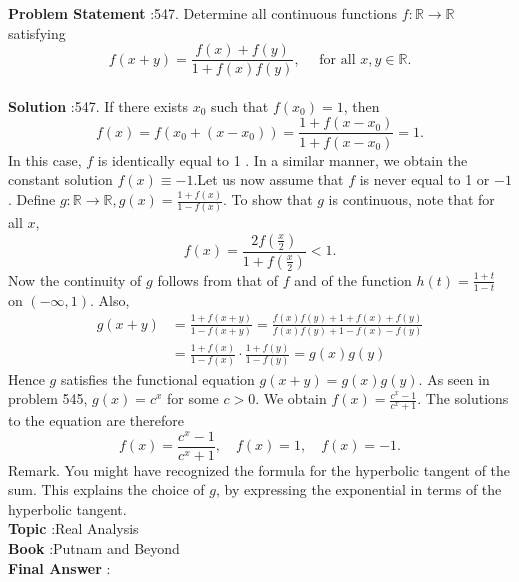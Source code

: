 \documentclass[10pt]{article}
\begin{document}
\textbf{Problem Statement} :547. Determine all continuous functions $f: \mathbb{R} \rightarrow \mathbb{R}$ satisfying$$ f(x+y)=\frac{f(x)+f(y)}{1+f(x) f(y)}, \quad \text { for all } x, y \in \mathbb{R} . $$\\
\textbf{Solution} :547. If there exists $x_{0}$ such that $f\left(x_{0}\right)=1$, then$$ f(x)=f\left(x_{0}+\left(x-x_{0}\right)\right)=\frac{1+f\left(x-x_{0}\right)}{1+f\left(x-x_{0}\right)}=1 . $$In this case, $f$ is identically equal to 1 . In a similar manner, we obtain the constant solution $f(x) \equiv-1$.Let us now assume that $f$ is never equal to 1 or $-1$. Define $g: \mathbb{R} \rightarrow \mathbb{R}, g(x)=\frac{1+f(x)}{1-f(x)}$. To show that $g$ is continuous, note that for all $x$,$$ f(x)=\frac{2 f\left(\frac{x}{2}\right)}{1+f\left(\frac{x}{2}\right)}<1 . $$Now the continuity of $g$ follows from that of $f$ and of the function $h(t)=\frac{1+t}{1-t}$ on $(-\infty, 1)$. Also,$$ \begin{aligned} g(x+y) &=\frac{1+f(x+y)}{1-f(x+y)}=\frac{f(x) f(y)+1+f(x)+f(y)}{f(x) f(y)+1-f(x)-f(y)} \\ &=\frac{1+f(x)}{1-f(x)} \cdot \frac{1+f(y)}{1-f(y)}=g(x) g(y) \end{aligned} $$Hence $g$ satisfies the functional equation $g(x+y)=g(x) g(y)$. As seen in problem 545, $g(x)=c^{x}$ for some $c>0$. We obtain $f(x)=\frac{c^{x}-1}{c^{x}+1}$. The solutions to the equation are therefore$$ f(x)=\frac{c^{x}-1}{c^{x}+1}, \quad f(x)=1, \quad f(x)=-1 . $$Remark. You might have recognized the formula for the hyperbolic tangent of the sum. This explains the choice of $g$, by expressing the exponential in terms of the hyperbolic tangent.\\
\textbf{Topic} :Real Analysis\\
\textbf{Book} :Putnam and Beyond\\
\textbf{Final Answer} :\\
\end{document}
